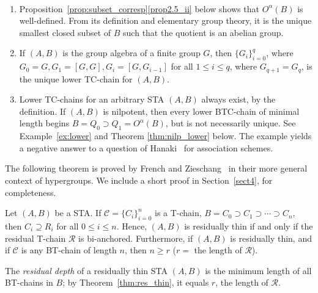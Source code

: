 \documentclass[ALCO,ThmDefs,Unicode,epreuves]{cedram}
\begin{document}
\begin{rema}\ \relax
\label{rem:not_unique}

\begin{enumerate}[label = (\roman*)] 
\item\label{rema1.13_i} Proposition~\ref{prop:subset_corresp}\ref{prop2.5_ii} below shows that
$O^{\alpha}(B)$ is well-defined. From its definition and elementary
group theory, it is the unique smallest closed subset of
$B$ such that the quotient is an abelian group. 
\item\label{rema1.13_ii} If $(A, B)$ is the group algebra of a finite group $G$, then
$\{G_i\}_{i=0}^q$, where $G_0 = G, G_1 = [G, G], G_i = [G, G_{i-1}]$ for all
$1 \leq i \leq q$, where $G_{q+1} = G_q$, is the unique lower TC-chain
for $(A, B)$.
\item\label{rema1.13_iii} Lower TC-chains for an arbitrary STA $(A, B)$ always exist, by the
definition. 
If $(A, B)$ is nilpotent, then every lower BTC-chain of minimal
length 
begins $B = Q_0 \supset Q_1 = O^{\alpha}(B)$, but is not necessarily
unique. 
See Example~\ref{ex:lower} and Theorem 
\ref{thm:nilp_lower} below. The example yields a negative answer to 
a 
question of Hanaki~\cite [Question~2.11]{H} for association
schemes. 
\end{enumerate}
\end{rema} 

The following theorem is proved by French and Zieschang~\cite [Theorem~6.1]{FZ} in their more
general context of hypergroups. We include a short proof in Section~\ref{sect4},
for completeness. 

\begin{thm}
\label{thm:res_thin}
Let $(A, B)$ be a STA. If $\mathcal{C} = \{C_i\}_{i=0}^n$ is a T-chain,
$B = C_0 \supset C_1 \supset \cdots \supset C_n$, then $C_i \supseteq
R_i$ for all $0 \leq i \leq n$. Hence, $(A, B)$ is residually thin if
and only if the residual T-chain $\mathcal{R}$ is bi-anchored.
Furthermore, if $(A, B)$ is residually thin, and if $\mathcal{C}$ is any
BT-chain of length $n$, then $n \geq r$ \textup{(}$r =$ the length of
$\mathcal{R}$\textup{)}.
\end{thm}

\begin{defi} 
\label{def:depth}
The \emph{residual depth} of a residually thin STA $(A, B)$ is the
minimum length of all BT-chains in $B$; by Theorem~\ref{thm:res_thin},
it equals $r$, the length of $\mathcal{R}$.
\end{defi}
\end{document}
